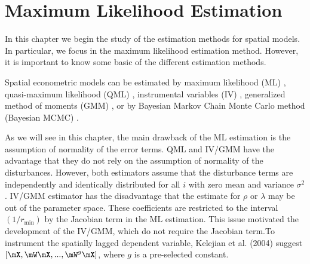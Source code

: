 \chapter{Maximum Likelihood Estimation}\label{chap:ML}

In this chapter we begin the study of the estimation methods for spatial models. In particular, we focus in the maximum likelihood estimation method. However, it is important to know some basic of the different estimation methods. 

Spatial econometric models can be estimated by maximum likelihood (ML) \citep{ord1975estimation}, quasi-maximum likelihood (QML) \citep{lee2004asymptotic}, instrumental variables (IV) \citep[][pp. 82-86]{anselin1988spatial}, generalized method of moments (GMM) \citep{kelejian1998generalized, kelejian1999generalized}, or by Bayesian Markov Chain Monte Carlo method (Bayesian MCMC) \citep{lesage1997bayesian}.

As we will see in this chapter, the main drawback of the ML estimation is the assumption of normality of the error terms. QML and IV/GMM have the advantage that they do not rely on the assumption of normality of the disturbances. However, both estimators assume that the disturbance terms are independently and identically distributed for all $i$ with zero mean and variance $\sigma^2$.  IV/GMM estimator has the disadvantage that the estimate for $\rho$ or $\lambda$ may be out of the parameter space. These coefficients are restricted to the interval $(1/r_{\mbox{min}})$ by the Jacobian term in the ML estimation. This issue motivated the development of the IV/GMM, which do not require the Jacobian term.To instrument the spatially lagged dependent variable, Kelejian et al. (2004) suggest $\left[\mX, \mW\mX,...,\mW^g\mX\right]$, where $g$ is a pre-selected constant. 






